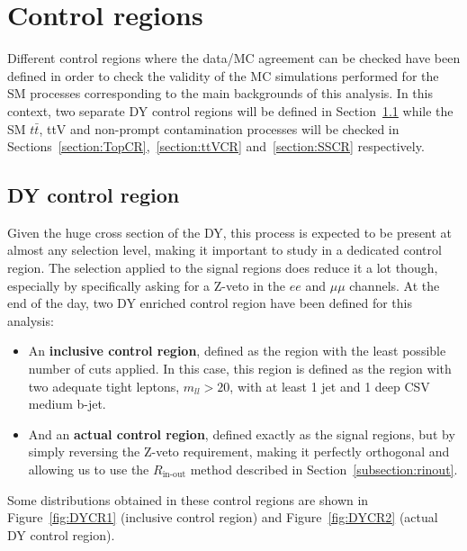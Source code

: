 \documentclass[a4paper, 10pt, openright]{report}
\begin{document}
\section{Control regions} \label{section:CR}

Different control regions where the data/\ac{MC} agreement can be checked have been defined in order to check the validity of the \ac{MC} simulations performed for the \ac{SM} processes corresponding to the main backgrounds of this analysis. In this context, two separate \ac{DY} control regions will be defined in Section~\ref{section:DYCR} while the \ac{SM} $t \bar t$, ttV and non-prompt contamination processes will be checked in Sections~\ref{section:TopCR},~\ref{section:ttVCR} and~\ref{section:SSCR} respectively.

\subsection{\acs{DY} control region} \label{section:DYCR}

Given the huge cross section of the \ac{DY}, this process is expected to be present at almost any selection level, making it important to study in a dedicated control region. The selection applied to the signal regions does reduce it a lot though, especially by specifically asking for a Z-veto in the $ee$ and $\mu \mu$ channels. At the end of the day, two \ac{DY} enriched control region have been defined for this analysis:

\begin{itemize}
\item An \textbf{inclusive control region}, defined as the region with the least possible number of cuts applied. In this case, this region is defined as the region with two adequate tight leptons, $m_{ll} > 20$, with at least 1 jet and 1 deep CSV medium b-jet. 
\item And an \textbf{actual control region}, defined exactly as the signal regions, but by simply reversing the Z-veto requirement, making it perfectly orthogonal and allowing us to use the $R_{\text{in-out}}$ method described in Section~\ref{subsection:rinout}. 
\end{itemize}

Some distributions obtained in these control regions are shown in Figure~\ref{fig:DYCR1} (inclusive control region) and Figure~\ref{fig:DYCR2} (actual \ac{DY} control region).
\end{document}
